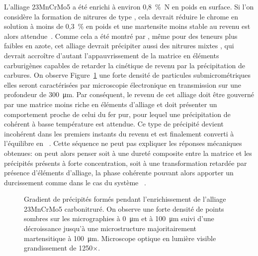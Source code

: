 L'alliage 23MnCrMo5 a été enrichi à environ 0,8~\%~N en poids en surface. Si l'on considère la formation de nitrures de type , cela devrait réduire le chrome en solution à moins de 0,3~\% en poids et une martensite moins stable au revenu est alors attendue~\cite{Grange1977}. Comme cela a été montré par \citet{Catteau2016}, même pour des teneurs plus faibles en azote, cet alliage devrait précipiter aussi des nitrures mixtes , qui devrait accroître d'autant l'appauvrissement de la matrice en éléments carburigènes capables de retarder la cinétique de revenu par la précipitation de carbures. On observe Figure~\ref{fig:microstructure-auto-quenched} une forte densité de particules submicrométriques \textendash{} elles seront caractérisées par microscopie électronique en transmission \textendash{} sur une profondeur de \SI{300}{\micro\metre}. Par conséquent, le revenu de cet alliage doit être gouverné par une matrice moins riche en éléments d'alliage et doit présenter un comportement proche de celui du fer pur, pour lequel une précipitation de  cohérent à basse température est attendue. Ce type de précipité devient incohérent dans les premiers instants du revenu et est finalement converti à l'équilibre en ~\cite{Kaplow1983,vanGent1985,Mittemeijer1988,Cheng199013,Cheng19902857,Fall1996,vanGenderen1997}. Cette séquence ne peut pas expliquer les réponses mécaniques obtenues: on peut alors penser soit à une \og{} dureté composite \fg{} entre la matrice et les précipités présents à forte concentration, soit à une transformation retardée par présence d'éléments d'alliage, la phase  cohérente pouvant alors apporter un durcissement comme dans le cas du système ~\cite{Mittemeijer2010}. 

\begin{figure}[h]
  
  \caption{\label{fig:microstructure-auto-quenched}Gradient de précipités formés pendant l'enrichissement de l'alliage 23MnCrMo5 carbonitruré. On observe une forte densité de points sombres sur les micrographies à \SI{0}{\micro\metre} et à \SI{100}{\micro\metre} suivi d'une décroissance jusqu'à une microstructure majoritairement martensitique à \SI{100}{\micro\metre}.  Microscope optique en lumière visible \textendash{} grandissement de 1250$\times$.}
\end{figure}

